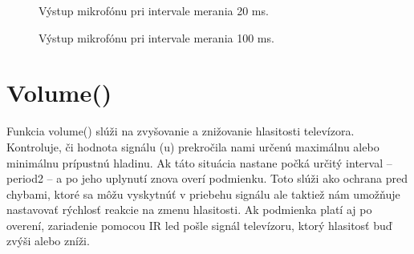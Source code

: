 \begin{figure}[!tbh]
\centering
{}
\caption{Výstup mikrofónu pri intervale merania 20 ms.}\label{OBRAZOK 2.1}
\end{figure}

\begin{figure}[!tbh]
\centering
{}
\caption{Výstup mikrofónu pri intervale merania 100 ms.}\label{OBRAZOK 2.2}
\end{figure}


\section{Volume()}

Funkcia volume() slúži na zvyšovanie a znižovanie hlasitosti televízora. Kontroluje, či hodnota signálu (u) prekročila nami určenú maximálnu alebo minimálnu prípustnú hladinu. Ak táto situácia nastane počká určitý interval – period2 – a po jeho uplynutí znova overí podmienku. Toto slúži ako ochrana pred chybami, ktoré sa môžu vyskytnúť v priebehu signálu ale taktiež nám umožňuje nastavovať rýchlosť reakcie na zmenu hlasitosti. Ak podmienka platí aj po overení, zariadenie pomocou IR led pošle signál televízoru, ktorý hlasitosť buď zvýši alebo zníži.

